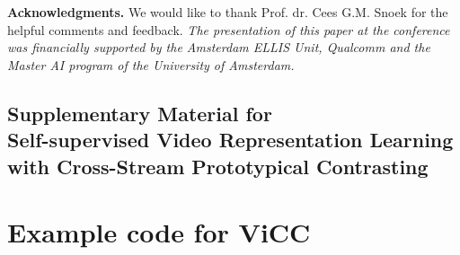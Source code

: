 \documentclass[10pt,twocolumn,letterpaper]{article}
\begin{document}
{\noindent \textbf{Acknowledgments.} We would like to thank Prof.\! dr.\! Cees G.M. Snoek for the helpful comments and feedback. \break
\noindent \textit{The presentation of this paper at the conference was financially supported by the Amsterdam ELLIS Unit, Qualcomm and the Master AI program of the University of Amsterdam.}} 
\clearpage
{\small


}

\clearpage

\begin{center}
\subsection*{Supplementary Material for \\ Self-supervised Video Representation Learning \\with Cross-Stream Prototypical Contrasting \\ }    
\end{center}

\appendix
\section{Example code for ViCC}
\end{document}
